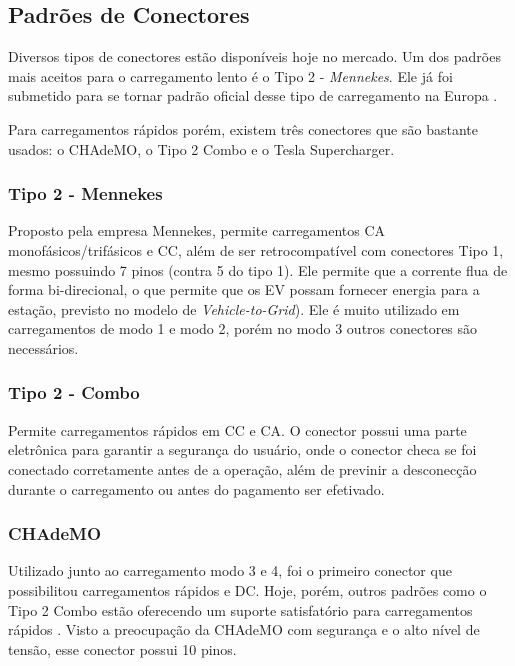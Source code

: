     \subsection{Padrões de Conectores}

      Diversos tipos de conectores estão disponíveis hoje no mercado. Um dos padrões mais aceitos para o carregamento lento é o Tipo 2 - \textit{Mennekes}. Ele já foi submetido para se tornar padrão oficial desse tipo de carregamento na Europa \cite{mckinsey-report-ev}.

      Para carregamentos rápidos porém, existem três conectores que são bastante usados: o CHAdeMO, o Tipo 2 Combo e o Tesla Supercharger.

      \subsubsection{Tipo 2 - Mennekes}

        Proposto pela empresa Mennekes, permite carregamentos \ac{CA} monofásicos/trifásicos e \ac{CC}, além de ser retrocompatível com conectores Tipo 1, mesmo possuindo 7 pinos (contra 5 do tipo 1). Ele permite que a corrente flua de forma bi-direcional, o que permite que os \ac{EV} possam fornecer energia para a estação, previsto no modelo de \textit{Vehicle-to-Grid}). Ele é muito utilizado em carregamentos de modo 1 e modo 2, porém no modo 3 outros conectores são necessários.

      \subsubsection{Tipo 2 - Combo}

        Permite carregamentos rápidos em \ac{CC} e \ac{CA}. O conector possui uma parte eletrônica para garantir a segurança do usuário, onde o conector checa se foi conectado corretamente antes de a operação, além de previnir a desconecção durante o carregamento ou antes do pagamento ser efetivado.

      \subsubsection{CHAdeMO}

        Utilizado junto ao carregamento modo 3 e 4, foi o primeiro conector que possibilitou carregamentos rápidos e DC. Hoje, porém, outros padrões como o Tipo 2 Combo estão oferecendo um suporte satisfatório para carregamentos rápidos \cite{ieee-review-evse}. Visto a preocupação da CHAdeMO com segurança e o alto nível de tensão, esse conector possui 10 pinos.

